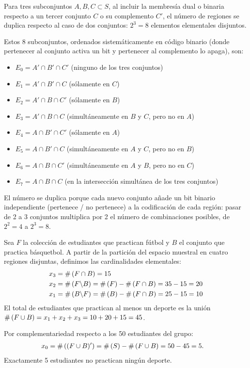 \begin{solproblema}[prob:320d62d]
	Para tres subconjuntos $A, B, C \subset S$, al incluir la membresía dual o binaria respecto a un tercer conjunto $C$ o su complemento $C'$, el número de regiones se duplica respecto al caso de dos conjuntos: $2^3 = 8$ elementos elementales disjuntos.

	Estos 8 subconjuntos, ordenados sistemáticamente en código binario (donde pertenecer al conjunto activa un bit y pertenecer al complemento lo apaga), son:
	\begin{itemize}
		\item $E_0 = A' \cap B' \cap C'$ (ninguno de los tres conjuntos)
		\item $E_1 = A' \cap B' \cap C$ (sólamente en $C$)
		\item $E_2 = A' \cap B \cap C'$ (sólamente en $B$)
		\item $E_3 = A' \cap B \cap C$ (simultáneamente en $B$ y $C$, pero no en $A$)
		\item $E_4 = A \cap B' \cap C'$ (sólamente en $A$)
		\item $E_5 = A \cap B' \cap C$ (simultáneamente en $A$ y $C$, pero no en $B$)
		\item $E_6 = A \cap B \cap C'$ (simultáneamente en $A$ y $B$, pero no en $C$)
		\item $E_7 = A \cap B \cap C$ (en la intersección simultánea de los tres conjuntos)
	\end{itemize}
	El número se duplica porque cada nuevo conjunto añade un bit binario independiente (pertenece / no pertenece) a la codificación de cada región: pasar de 2 a 3 conjuntos multiplica por 2 el número de combinaciones posibles, de $2^2=4$ a $2^3=8$.
\end{solproblema}

\begin{solproblema}
	Sea $F$ la colección de estudiantes que practican fútbol y $B$ el conjunto que practica básquetbol. A partir de la partición del espacio muestral en cuatro regiones disjuntas, definimos las cardinalidades elementales:
	\begin{align}
		x_3 &= \#\left( F \cap B \right) = 15 \\
		x_2 &= \#\left( F \backslash B \right) = \#\left( F \right) - \#\left( F \cap B \right) = 35 - 15 = 20 \\
		x_1 &= \#\left( B \backslash F \right) = \#\left( B \right) - \#\left( F \cap B \right) = 25 - 15 = 10
	\end{align}
	El total de estudiantes que practican al menos un deporte es la unión $\#\left( F \cup B \right) = x_1 + x_2 + x_3 = 10 + 20 + 15 = 45$.

	Por complementariedad respecto a los 50 estudiantes del grupo:
	\begin{align}
		x_0 &= \#\left( (F \cup B)' \right) = \#\left( S \right) - \#\left( F \cup B \right) = 50 - 45 = 5.
	\end{align}
	Exactamente 5 estudiantes no practican ningún deporte.
\end{solproblema}

